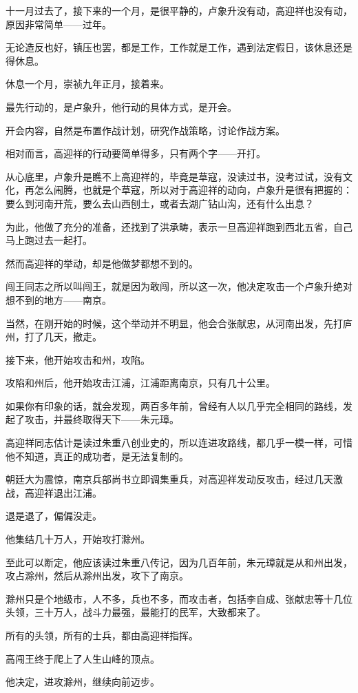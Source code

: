 \begin{multicols}{\theparacolNo}
十一月过去了，接下来的一个月，是很平静的，卢象升没有动，高迎祥也没有动，原因非常简单——过年。

无论造反也好，镇压也罢，都是工作，工作就是工作，遇到法定假日，该休息还是得休息。

休息一个月，崇祯九年正月，接着来。

最先行动的，是卢象升，他行动的具体方式，是开会。

开会内容，自然是布置作战计划，研究作战策略，讨论作战方案。

相对而言，高迎祥的行动要简单得多，只有两个字——开打。

从心底里，卢象升是瞧不上高迎祥的，毕竟是草寇，没读过书，没考过试，没有文化，再怎么闹腾，也就是个草寇，所以对于高迎祥的动向，卢象升是很有把握的：要么到河南开荒，要么去山西刨土，或者去湖广钻山沟，还有什么出息？

为此，他做了充分的准备，还找到了洪承畴，表示一旦高迎祥跑到西北五省，自己马上跑过去一起打。

然而高迎祥的举动，却是他做梦都想不到的。

闯王同志之所以叫闯王，就是因为敢闯，所以这一次，他决定攻击一个卢象升绝对想不到的地方——南京。

当然，在刚开始的时候，这个举动并不明显，他会合张献忠，从河南出发，先打庐州，打了几天，撤走。

接下来，他开始攻击和州，攻陷。

攻陷和州后，他开始攻击江浦，江浦距离南京，只有几十公里。

如果你有印象的话，就会发现，两百多年前，曾经有人以几乎完全相同的路线，发起了攻击，并最终取得天下——朱元璋。

高迎祥同志估计是读过朱重八创业史的，所以连进攻路线，都几乎一模一样，可惜他不知道，真正的成功者，是无法复制的。

朝廷大为震惊，南京兵部尚书立即调集重兵，对高迎祥发动反攻击，经过几天激战，高迎祥退出江浦。

退是退了，偏偏没走。

他集结几十万人，开始攻打滁州。

至此可以断定，他应该读过朱重八传记，因为几百年前，朱元璋就是从和州出发，攻占滁州，然后从滁州出发，攻下了南京。

滁州只是个地级市，人不多，兵也不多，而攻击者，包括李自成、张献忠等十几位头领，三十万人，战斗力最强，最能打的民军，大致都来了。

所有的头领，所有的士兵，都由高迎祥指挥。

高闯王终于爬上了人生山峰的顶点。

他决定，进攻滁州，继续向前迈步。


\end{multicols}
